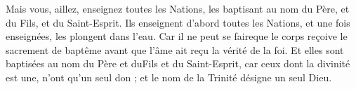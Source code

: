  Mais vous, aillez, enseignez toutes les Nations, les baptisant au nom du Père, et du Fils, et du Saint-Esprit. Ils enseignent d’abord toutes les Nations, et une fois enseignées, les plongent dans l’eau. Car il ne peut se faireque le corps reçoive le sacrement de baptême avant que l’âme ait reçu la vérité de la foi. Et elles sont baptisées au nom du Père et duFils et du Saint-Esprit, car ceux dont la divinité est une, n’ont qu'un seul don ; et le nom de la Trinité désigne un seul Dieu.